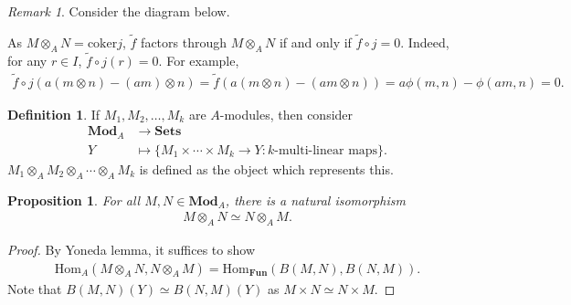 \documentclass[12pt]{report}
\theoremstyle{plain}
\newtheorem{proposition}[theorem]{Proposition}
\theoremstyle{remark}
\newtheorem*{remark}{Remark}
\theoremstyle{definition}
\newtheorem{definition}[theorem]{Definition}
\newcommand{\Hom}[3]{\mathrm{Hom}_{#3}(#1,#2)}
\begin{document}
\begin{remark}
    Consider the diagram below.
    \begin{figure}[H]
        \centering
    \end{figure}
    \noindent As $M\otimes_A N=\mathrm{coker}j$, $\tilde{f}$ factors through $M\otimes_A N$ if and only if $\tilde{f}\circ j = 0$. Indeed, for any $r\in I$, $\tilde{f}\circ j(r)=0$. For example,
    \begin{align*}
        \tilde{f}\circ j(a(m\otimes n)-(am)\otimes n) = \tilde{f}(a(m\otimes n)-(am\otimes n)) = a\phi(m,n)-\phi(am,n)=0.
    \end{align*}
\end{remark}

\begin{definition}
    If $M_1,M_2,\dots,M_k$ are $A$-modules, then consider
    \begin{align*}
        \mathbf{Mod}_A &\to \mathbf{Sets} \\
        Y &\mapsto \{M_1\times\cdots\times M_k\to Y:k\text{-multi-linear maps}\}.
    \end{align*}
    $M_1\otimes_A M_2\otimes_A\cdots \otimes_A M_k$ is defined as the object which represents this.
\end{definition}
    
\begin{proposition}
    For all $M,N\in\mathbf{Mod}_A$, there is a natural isomorphism
    \begin{align*}
        M\otimes_A N\simeq N\otimes_A M.
    \end{align*}
\end{proposition}
\begin{proof}
    By Yoneda lemma, it suffices to show
    \begin{align*}
        \Hom{M\otimes_A N}{N\otimes_A M}{A} = \Hom{B(M,N)}{B(N,M)}{\mathbf{Fun}}.
    \end{align*}
    Note that $B(M,N)(Y)\simeq B(N,M)(Y)$ as $M\times N\simeq N\times M$.
\end{proof}
\end{document}
